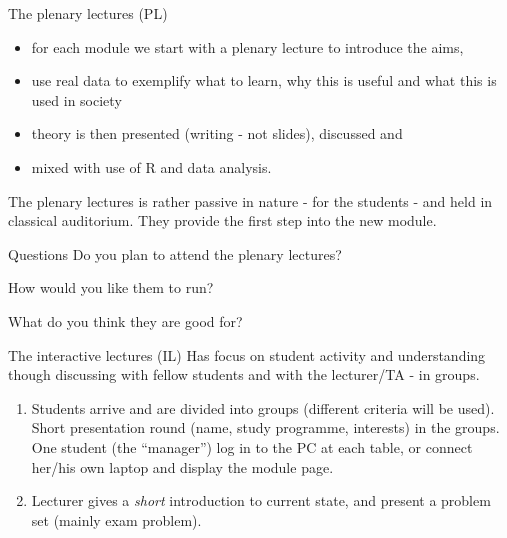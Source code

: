 \documentclass[
  ignorenonframetext,
]{beamer}
\providecommand{\tightlist}{%
  \setlength{\itemsep}{0pt}\setlength{\parskip}{0pt}}
\begin{document}
\begin{frame}
\begin{block}{The plenary lectures (PL)}
\label{the-plenary-lectures-pl}
\begin{itemize}
\tightlist
\item
  for each module we start with a plenary lecture to introduce the aims,
\item
  use real data to exemplify what to learn, why this is useful and what
  this is used in society
\item
  theory is then presented (writing - not slides), discussed and
\item
  mixed with use of R and data analysis.
\end{itemize}

The plenary lectures is rather passive in nature - for the students -
and held in classical auditorium. They provide the first step into the
new module.
\end{block}
\end{frame}

\begin{frame}
\begin{block}{Questions}
\label{questions}
Do you plan to attend the plenary lectures?

How would you like them to run?

What do you think they are good for?
\end{block}
\end{frame}

\begin{frame}
\begin{block}{The interactive lectures (IL)}
\label{the-interactive-lectures-il}
Has focus on student activity and understanding though discussing with
fellow students and with the lecturer/TA - in groups.

\begin{enumerate}
\item
  Students arrive and are divided into groups (different criteria will
  be used). Short presentation round (name, study programme, interests)
  in the groups. One student (the ``manager'') log in to the PC at each
  table, or connect her/his own laptop and display the module page.
\item
  Lecturer gives a \emph{short} introduction to current state, and
  present a problem set (mainly exam problem).
\end{enumerate}
\end{block}
\end{frame}
\end{document}
